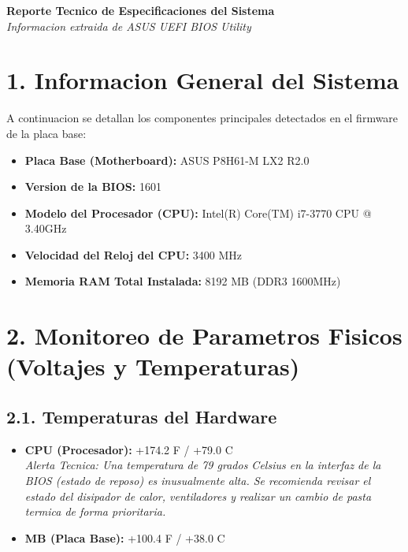 \documentclass[11pt,a4paper]{article}
\begin{document}
\begin{center}
    {\LARGE \textbf{Reporte Tecnico de Especificaciones del Sistema}} \\
    \vspace{0.2cm}
    {\large \textit{Informacion extraida de ASUS UEFI BIOS Utility}}
\end{center}

\vspace{0.5cm}

\section*{1. Informacion General del Sistema}
A continuacion se detallan los componentes principales detectados en el firmware de la placa base:

\begin{itemize}
    \item \textbf{Placa Base (Motherboard):} ASUS P8H61-M LX2 R2.0
    \item \textbf{Version de la BIOS:} 1601
    \item \textbf{Modelo del Procesador (CPU):} Intel(R) Core(TM) i7-3770 CPU @ 3.40GHz
    \item \textbf{Velocidad del Reloj del CPU:} 3400 MHz
    \item \textbf{Memoria RAM Total Instalada:} 8192 MB (DDR3 1600MHz)
\end{itemize}

\section*{2. Monitoreo de Parametros Fisicos (Voltajes y Temperaturas)}

\subsection*{2.1. Temperaturas del Hardware}
\begin{itemize}
    \item \textbf{CPU (Procesador):} +174.2 F / +79.0 C \\
    \textit{Alerta Tecnica: Una temperatura de 79 grados Celsius en la interfaz de la BIOS (estado de reposo) es inusualmente alta. Se recomienda revisar el estado del disipador de calor, ventiladores y realizar un cambio de pasta termica de forma prioritaria.}
    \item \textbf{MB (Placa Base):} +100.4 F / +38.0 C
\end{itemize}
\end{document}
